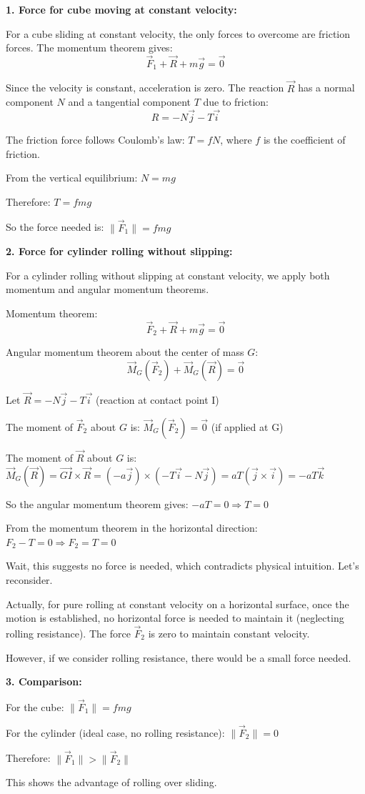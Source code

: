 \documentclass[12pt]{article}
\begin{document}
\begin{correctionbox}
\textbf{1. Force for cube moving at constant velocity:}

For a cube sliding at constant velocity, the only forces to overcome are friction forces. The momentum theorem gives:
$$\vec{F}_1 + \vec{R} + m\vec{g} = \vec{0}$$

Since the velocity is constant, acceleration is zero. The reaction $\vec{R}$ has a normal component $N$ and a tangential component $T$ due to friction:
$$R = -N\vec{j} - T\vec{i}$$

The friction force follows Coulomb's law: $T = fN$, where $f$ is the coefficient of friction.

From the vertical equilibrium: $N = mg$

Therefore: $T = fmg$

So the force needed is: $\|\vec{F}_1\| = fmg$

\textbf{2. Force for cylinder rolling without slipping:}

For a cylinder rolling without slipping at constant velocity, we apply both momentum and angular momentum theorems.

Momentum theorem:
$$\vec{F}_2 + \vec{R} + m\vec{g} = \vec{0}$$

Angular momentum theorem about the center of mass $G$:
$$\vec{M}_G(\vec{F}_2) + \vec{M}_G(\vec{R}) = \vec{0}$$

Let $\vec{R} = -N\vec{j} - T\vec{i}$ (reaction at contact point I)

The moment of $\vec{F}_2$ about $G$ is: $\vec{M}_G(\vec{F}_2) = \vec{0}$ (if applied at G)

The moment of $\vec{R}$ about $G$ is: $\vec{M}_G(\vec{R}) = \vec{GI} \times \vec{R} = (-a\vec{j}) \times (-T\vec{i} - N\vec{j}) = aT(\vec{j} \times \vec{i}) = -aT\vec{k}$

So the angular momentum theorem gives: $-aT = 0 \Rightarrow T = 0$

From the momentum theorem in the horizontal direction: $F_2 - T = 0 \Rightarrow F_2 = T = 0$

Wait, this suggests no force is needed, which contradicts physical intuition. Let's reconsider.

Actually, for pure rolling at constant velocity on a horizontal surface, once the motion is established, no horizontal force is needed to maintain it (neglecting rolling resistance). The force $\vec{F}_2$ is zero to maintain constant velocity.

However, if we consider rolling resistance, there would be a small force needed.

\textbf{3. Comparison:}

For the cube: $\|\vec{F}_1\| = fmg$

For the cylinder (ideal case, no rolling resistance): $\|\vec{F}_2\| = 0$

Therefore: $\|\vec{F}_1\| > \|\vec{F}_2\|$

This shows the advantage of rolling over sliding.
\end{correctionbox}
\end{document}
